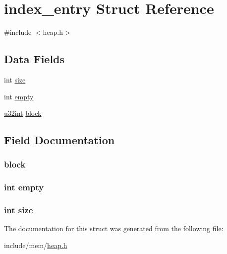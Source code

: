 \hypertarget{structindex__entry}{}\section{index\+\_\+entry Struct Reference}
\label{structindex__entry}


{\ttfamily \#include $<$heap.\+h$>$}

\subsection*{Data Fields}
\begin{DoxyCompactItemize}
\item 
int \hyperlink{structindex__entry_a439227feff9d7f55384e8780cfc2eb82}{size}
\item 
int \hyperlink{structindex__entry_a7d076984670ab0600048b27ffb9ccdc3}{empty}
\item 
\hyperlink{system_8h_a757de76cafbcddaac0d1632902fe4cb8}{u32int} \hyperlink{structindex__entry_a149bb6ecda94461da44658b57b575133}{block}
\end{DoxyCompactItemize}


\subsection{Field Documentation}
\subsubsection[{\texorpdfstring{block}{block}}]{ block}\hypertarget{structindex__entry_a149bb6ecda94461da44658b57b575133}{}\label{structindex__entry_a149bb6ecda94461da44658b57b575133}
\subsubsection[{\texorpdfstring{empty}{empty}}]{\setlength{\rightskip}{0pt plus 5cm}int empty}\hypertarget{structindex__entry_a7d076984670ab0600048b27ffb9ccdc3}{}\label{structindex__entry_a7d076984670ab0600048b27ffb9ccdc3}
\subsubsection[{\texorpdfstring{size}{size}}]{\setlength{\rightskip}{0pt plus 5cm}int size}\hypertarget{structindex__entry_a439227feff9d7f55384e8780cfc2eb82}{}\label{structindex__entry_a439227feff9d7f55384e8780cfc2eb82}


The documentation for this struct was generated from the following file\+:\begin{DoxyCompactItemize}
\item 
include/mem/\hyperlink{heap_8h}{heap.\+h}\end{DoxyCompactItemize}
